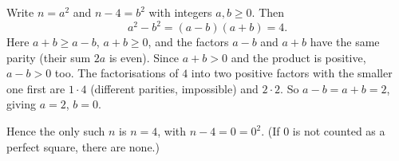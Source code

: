 Write $n=a^2$ and $n-4=b^2$ with integers $a,b\ge0$. Then
\[a^2-b^2=(a-b)(a+b)=4.\]
Here $a+b\ge a-b$, $a+b\ge0$, and the factors $a-b$ and $a+b$ have the same parity (their sum $2a$ is even). Since $a+b>0$ and the product is positive, $a-b>0$ too. The factorisations of $4$ into two positive factors with the smaller one first are $1\cdot4$ (different parities, impossible) and $2\cdot2$. So $a-b=a+b=2$, giving $a=2$, $b=0$.

Hence the only such $n$ is $\boxed{n=4}$, with $n-4=0=0^2$. (If $0$ is not counted as a perfect square, there are none.)
